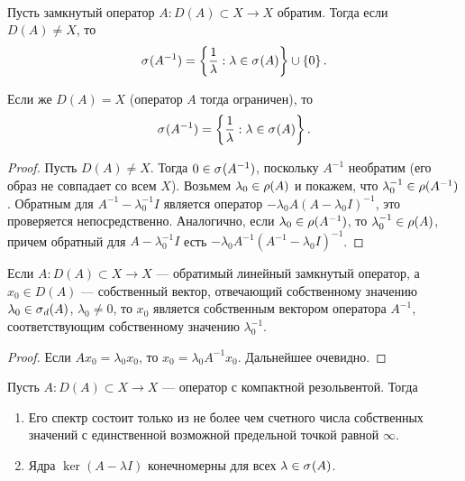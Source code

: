 \begin{theorem}\label{th:inverse_spectrum}\hfill\\
    \indent Пусть замкнутый оператор $A \colon D(A) \subset X \to X$ обратим. Тогда если
    $D(A) \neq X$, то
    \[ \spectrum{A^{-1}} 
        = \menge{\frac{1}{\lambda} : \lambda \in \spectrum{A}} \cup \menge{0}. \]

    Если же $D(A) = X$ (оператор $A$ тогда ограничен), то
    \[ \spectrum{A^{-1}} 
        = \menge{\frac{1}{\lambda} : \lambda \in \spectrum{A}}. \] 
\end{theorem}

\begin{proof}
    Пусть $D(A) \neq X$. Тогда $0 \in \spectrum{A^{-1}}$, поскольку $A^{-1}$ необратим (его образ
    не совпадает со всем $X$). Возьмем $\lambda_0 \in \resset{A}$ и покажем, 
    что $\lambda_0^{-1} \in \resset{A^{-1}}$. Обратным для
    $A^{-1} - \lambda_0^{-1} I$ является оператор $-\lambda_0 A (A - \lambda_0 I)^{-1}$,
    это проверяется непосредственно. Аналогично, если $\lambda_0 \in \resset{A^{-1}}$,
    то $\lambda_0^{-1} \in \resset{A}$, причем обратный для $A - \lambda_0^{-1} I$ есть
    $-\lambda_0 A^{-1}(A^{-1} - \lambda_0 I)^{-1}$.
\end{proof}

\begin{lemma}
    Если $A \colon D(A) \subset X \to X$ --- обратимый линейный замкнутый оператор, 
    а $x_0 \in D(A)$ ---    собственный вектор, отвечающий собственному значению 
    $\lambda_0 \in \spectrum[d]{A}$, $\lambda_0 \neq 0$, то $x_0$ является собственным
    вектором оператора $A^{-1}$, соответствующим собственному значению $\lambda_0^{-1}$.
\end{lemma}

\begin{proof}
    Если $Ax_0 = \lambda_0 x_0$, то $x_0 = \lambda_0 A^{-1} x_0$. Дальнейшее очевидно.
\end{proof}

\begin{theorem}
    Пусть $A \colon D(A) \subset X \to X$ --- оператор с компактной резольвентой. Тогда
    \begin{enumerate}
        \item Его спектр состоит только из не более чем счетного числа собственных значений с 
        единственной возможной предельной точкой равной $\infty$.
        \item Ядра $\ker(A - \lambda I)$ конечномерны для всех $\lambda \in \spectrum{A}$.
    \end{enumerate}
\end{theorem}

